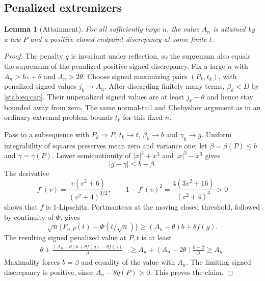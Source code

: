 \documentclass[11pt,a4paper]{article}
\numberwithin{equation}{section}
\newtheorem{lemma}[theorem]{Lemma}
\theoremstyle{definition}
\theoremstyle{remark}
\begin{document}
\subsection{Penalized extremizers}

\begin{lemma}[Attainment]\label{stab:lem:attainment}
For all sufficiently large $n$, the value $A_n$ is attained by a law
$P$ and a positive closed-endpoint discrepancy at some finite $t$.
\end{lemma}
\begin{proof}
The penalty $q$ is invariant under reflection, so the supremum also
equals the supremum of the penalized positive signed discrepancy.
Fix a large $n$ with $A_n>h_*+\theta$ and $A_n>2\theta$.
Choose signed maximizing pairs $(P_k,t_k)$, with penalized signed
values $j_k\to A_n$. After discarding finitely many terms,
$\beta_k<D$ by \eqref{stab:eq:cap}. Their unpenalized signed values
are at least $j_k-\theta$ and hence stay bounded away from zero.
The same normal-tail and Chebyshev argument
as in an ordinary extremal problem bounds $t_k$ for this fixed $n$.

Pass to a subsequence with $P_k\Rightarrow P$, $t_k\to t$,
$\beta_k\to b$ and $\gamma_k\to g$. Uniform integrability of
squares preserves mean zero and variance one; let
$\beta=\beta(P)\le b$ and $\gamma=\gamma(P)$.
Lower semicontinuity of $|x|^3+x^3$ and $|x|^3-x^3$ gives
\begin{equation}\label{stab:eq:escape}
                         |g-\gamma|\le b-\beta.
\end{equation}
The derivative
\[
 f'(v)=\frac{v(v^2+6)}{(v^2+4)^{3/2}},\qquad
 1-f'(v)^2=\frac{4(3v^2+16)}{(v^2+4)^3}>0
\]
shows that $f$ is $1$-Lipschitz. Portmanteau at the moving closed
threshold, followed by continuity of $\Phi$, gives
\[
 \sqrt n\{F_{n,P}(t)-\Phi(t/\sqrt n)\}
                  \ge(A_n-\theta)b+\theta f(g).
\]
The resulting signed penalized value at $P,t$ is at least
\[
 \begin{split}
 \theta+\frac{(A_n-\theta)b+\theta f(g)-\theta f(\gamma)}\beta
 &\ge A_n+(A_n-2\theta)\frac{b-\beta}\beta\ge A_n.
 \end{split}
\]
Maximality forces $b=\beta$ and equality of the value with $A_n$.
The limiting signed discrepancy is positive, since
$A_n-\theta q(P)>0$. This proves the claim.
\end{proof}
\end{document}
